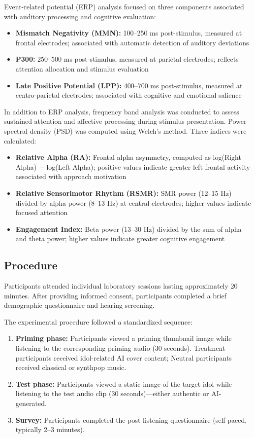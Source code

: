\documentclass[12pt, a4paper]{article}
\begin{document}
Event-related potential (ERP) analysis focused on three components associated with auditory processing and cognitive evaluation:
\begin{itemize}
    \item \textbf{Mismatch Negativity (MMN):} 100--250 ms post-stimulus, measured at frontal electrodes; associated with automatic detection of auditory deviations
    \item \textbf{P300:} 250--500 ms post-stimulus, measured at parietal electrodes; reflects attention allocation and stimulus evaluation
    \item \textbf{Late Positive Potential (LPP):} 400--700 ms post-stimulus, measured at centro-parietal electrodes; associated with cognitive and emotional salience
\end{itemize}

In addition to ERP analysis, frequency band analysis was conducted to assess sustained attention and affective processing during stimulus presentation. Power spectral density (PSD) was computed using Welch's method. Three indices were calculated:
\begin{itemize}
    \item \textbf{Relative Alpha (RA):} Frontal alpha asymmetry, computed as log(Right Alpha) $-$ log(Left Alpha); positive values indicate greater left frontal activity associated with approach motivation
    \item \textbf{Relative Sensorimotor Rhythm (RSMR):} SMR power (12--15 Hz) divided by alpha power (8--13 Hz) at central electrodes; higher values indicate focused attention
    \item \textbf{Engagement Index:} Beta power (13--30 Hz) divided by the sum of alpha and theta power; higher values indicate greater cognitive engagement
\end{itemize}

\subsection{Procedure}

Participants attended individual laboratory sessions lasting approximately 20 minutes. After providing informed consent, participants completed a brief demographic questionnaire and hearing screening.

The experimental procedure followed a standardized sequence:

\begin{enumerate}
    \item \textbf{Priming phase:} Participants viewed a priming thumbnail image while listening to the corresponding priming audio (30 seconds). Treatment participants received idol-related AI cover content; Neutral participants received classical or synthpop music.
    \item \textbf{Test phase:} Participants viewed a static image of the target idol while listening to the test audio clip (30 seconds)---either authentic or AI-generated.
    \item \textbf{Survey:} Participants completed the post-listening questionnaire (self-paced, typically 2--3 minutes).
\end{enumerate}
\end{document}
